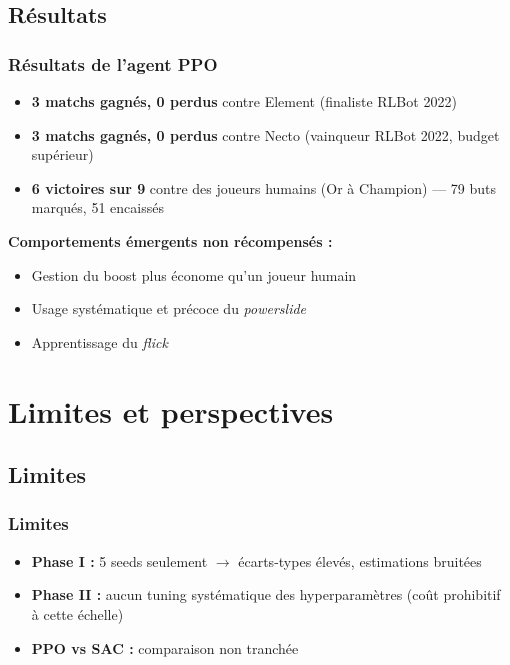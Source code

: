 \documentclass{beamer}
\begin{document}
\subsection{Résultats}
\begin{frame}
\frametitle{Résultats de l'agent PPO}

\begin{itemize}
    \item \textbf{3 matchs gagnés, 0 perdus} contre Element (finaliste RLBot 2022)
    \item \textbf{3 matchs gagnés, 0 perdus} contre Necto (vainqueur RLBot 2022, budget
        supérieur)
    \item \textbf{6 victoires sur 9} contre des joueurs humains
        (Or à Champion) — 79 buts marqués, 51 encaissés
\end{itemize}

\nocite{RLBotChampionship2022}

\vspace{0.5cm}

\pause

\textbf{Comportements émergents non récompensés :}
\begin{itemize}
    \item Gestion du boost plus économe qu'un joueur humain
    \item Usage systématique et précoce du \emph{powerslide}
    \item Apprentissage du \textit{flick}
\end{itemize}

\end{frame}

\section{Limites et perspectives}

\subsection{Limites}
\begin{frame}
\frametitle{Limites}

\begin{itemize}
    \item \textbf{Phase I :} 5 seeds seulement $\rightarrow$
    écarts-types élevés, estimations bruitées
    \item \textbf{Phase II :} aucun tuning systématique des
    hyperparamètres (coût prohibitif à cette échelle)
    \item \textbf{PPO vs SAC :} comparaison non tranchée
\end{itemize}

\end{frame}
\end{document}
